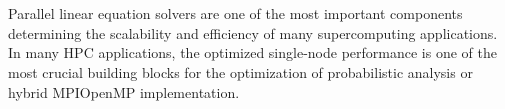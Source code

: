 \chapter{\abstractname}


Parallel linear equation solvers are one of the most important components determining the scalability and efficiency of many supercomputing applications.\\

In many HPC applications, the optimized single-node performance is one of the most crucial building blocks for the optimization of probabilistic analysis or hybrid MPIOpenMP implementation.




